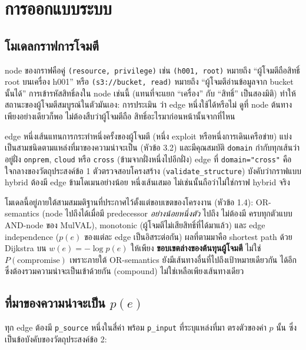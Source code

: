 \chapter{การออกแบบระบบ}

\section{โมเดลกราฟการโจมตี}

node ของกราฟคือคู่ \texttt{(resource, privilege)} เช่น \texttt{(h001, root)} หมายถึง
``ผู้โจมตีถือสิทธิ์ root บนเครื่อง h001'' หรือ \texttt{(s3://bucket, read)} หมายถึง
``ผู้โจมตีอ่านข้อมูลจาก bucket นั้นได้'' การเข้ารหัสสิทธิ์ลงใน node เช่นนี้ (แทนที่จะแยก
``เครื่อง'' กับ ``สิทธิ์'' เป็นสองมิติ) ทำให้สถานะของผู้โจมตีสมบูรณ์ในตัวมันเอง: การประเมิน
ว่า edge หนึ่งใช้ได้หรือไม่ ดูที่ node ต้นทางเพียงอย่างเดียวก็พอ ไม่ต้องสืบว่าผู้โจมตีถือ
สิทธิ์อะไรมาก่อนหน้านั้นจากที่ไหน

edge หนึ่งเส้นแทนการกระทำหนึ่งครั้งของผู้โจมตี (หนึ่ง exploit หรือหนึ่งการเดินเครือข่าย)
แบ่งเป็นสามชนิดตามแหล่งที่มาของความน่าจะเป็น (หัวข้อ 3.2) และมีคุณสมบัติ \texttt{domain}
กำกับทุกเส้นว่าอยู่ฝั่ง \texttt{onprem}, \texttt{cloud} หรือ \texttt{cross} (ข้ามจากฝั่งหนึ่งไปอีกฝั่ง)
edge ที่ \texttt{domain="cross"} คือใจกลางของวัตถุประสงค์ข้อ 1 ตัวตรวจสอบโครงสร้าง
(\texttt{validate\_structure}) บังคับว่ากราฟแบบ hybrid ต้องมี edge ข้ามโดเมนอย่างน้อย
หนึ่งเส้นเสมอ ไม่เช่นนั้นถือว่าไม่ใช่กราฟ hybrid จริง

โมเดลนี้อยู่ภายใต้สามสมมติฐานที่ประกาศไว้ตั้งแต่ขอบเขตของโครงงาน (หัวข้อ 1.4):
OR-semantics (node ไปถึงได้เมื่อมี predecessor \emph{อย่างน้อยหนึ่งตัว} ไปถึง ไม่ต้องมี
ครบทุกตัวแบบ AND-node ของ MulVAL), monotonic (ผู้โจมตีไม่เสียสิทธิ์ที่ได้มาแล้ว) และ
edge independence ($p(e)$ ของแต่ละ edge เป็นอิสระต่อกัน) ผลที่ตามมาคือ shortest path
ด้วย Dijkstra บน $w(e)=-\log p(e)$ ให้เพียง \textbf{ขอบเขตล่างของต้นทุนผู้โจมตี} ไม่ใช่
$P(\text{compromise})$ เพราะภายใต้ OR-semantics ยังมีเส้นทางอื่นที่ไปถึงเป้าหมายเดียวกัน
ได้อีก ซึ่งต้องรวมความน่าจะเป็นเข้าด้วยกัน (compound) ไม่ใช่เหลือเพียงเส้นทางเดียว

\section{ที่มาของความน่าจะเป็น $p(e)$}

ทุก edge ต้องมี \texttt{p\_source} หนึ่งในสี่ค่า พร้อม \texttt{p\_input} ที่ระบุแหล่งที่มา
ตรงตัวของค่า $p$ นั้น ซึ่งเป็นข้อบังคับของวัตถุประสงค์ข้อ 2:

